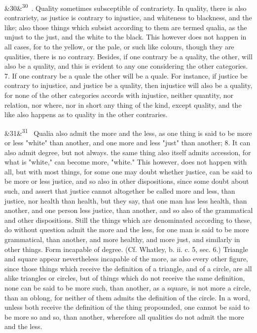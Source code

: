 \documentclass[12pt]{article}
\newcommand{\para}[1][]{\par\noindent\ifx&#1&\else\textsuperscript{\footnotesize #1}~\fi}
\begin{document}
\para[30] 6. Quality sometimes subsceptible of contrariety. In quality, there is also contrariety, as justice is contrary to injustice, and whiteness to blackness, and the like; also those things which subsist according to them are termed qualia, as the unjust to the just, and the white to the black. This however does not happen in all cases, for to the yellow, or the pale, or such like colours, though they are qualities, there is no contrary. Besides, if one contrary be a quality, the other, will also be a quality, and this is evident to any one considering the other categories. 7. If one contrary be a quale the other will be a quale. For instance, if justice be contrary to injustice, and justice be a quality, then injustice will also be a quality, for none of the other categories accords with injustice, neither quantity, nor relation, nor where, nor in short any thing of the kind, except quality, and the like also happens as to quality in the other contraries.

\para[31] Qualia also admit the more and the less, as one thing is said to be more or less "white" than another, and one more and less "just" than another; 8. It can also admit degree, but not always. the same thing also itself admits accession, for what is "white," can become more, "white." This however, does not happen with all, but with most things, for some one may doubt whether justice, can be said to be more or less justice, and so also in other dispositions, since some doubt about such, and assert that justice cannot altogether be called more and less, than justice, nor health than health, but they say, that one man has less health, than another, and one person less justice, than another, and so also of the grammatical and other dispositions. Still the things which are denominated according to these, do without question admit the more and the less, for one man is said to be more grammatical, than another, and more healthy, and more just, and similarly in other things. Form incapable of degree. (Cf. Whatley, b. ii. c. 5, sec. 6.) Triangle and square appear nevertheless incapable of the more, as also every other figure, since those things which receive the definition of a triangle, and of a circle, are all alike triangles or circles, but of things which do not receive the same definition, none can be said to be more such, than another, as a square, is not more a circle, than an oblong, for neither of them admits the definition of the circle. In a word, unless both receive the definition of the thing propounded, one cannot be said to be more so and so, than another, wherefore all qualities do not admit the more and the less.
\end{document}
